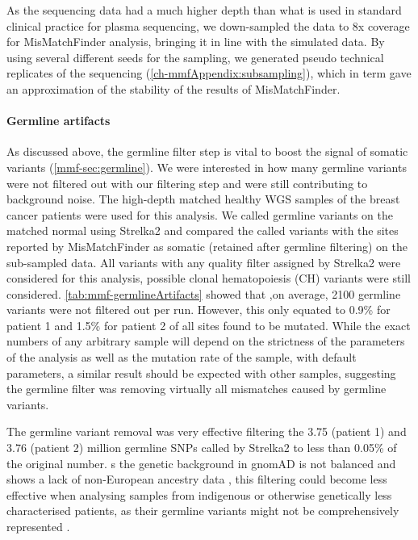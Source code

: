 As the sequencing data had a much higher depth than what is used in standard clinical practice for plasma sequencing, we down-sampled the data to 8x coverage for MisMatchFinder analysis, bringing it in line with the simulated data. By using several different seeds for the sampling, we generated pseudo technical replicates of the sequencing (\autoref{ch-mmfAppendix:subsampling}), which in term gave an approximation of the stability of the results of MisMatchFinder.


\paragraph{Germline artifacts}
\label{mmf-sec:germlineArtifacts}
As discussed above, the germline filter step is vital to boost the signal of somatic variants (\autoref{mmf-sec:germline}). We were interested in how many germline variants were not filtered out with our filtering step and were still contributing to background noise. The high-depth matched healthy WGS samples of the breast cancer patients were used for this analysis. We called germline variants on the matched normal using Strelka2 and compared the called variants with the sites reported by MisMatchFinder as somatic (retained after germline filtering) on the sub-sampled data. All variants with any quality filter assigned by Strelka2 were considered for this analysis,  possible clonal hematopoiesis (CH) variants were still considered. \autoref{tab:mmf-germlineArtifacts} showed that ,on average, 2100 germline variants were not filtered out per run. However, this only equated to 0.9\% for patient 1 and 1.5\% for patient 2 of all sites found to be mutated. While the exact numbers of any arbitrary sample will depend on the strictness of the parameters of the analysis as well as the mutation rate of the sample, with default parameters, a similar result should be expected with other samples, suggesting the germline filter was removing virtually all mismatches caused by germline variants.

The germline variant removal was  very effective filtering the 3.75 (patient 1) and 3.76 (patient 2) million germline SNPs called by Strelka2 to less than 0.05\% of the original number. s the genetic background in gnomAD is not balanced and shows a lack of non-European ancestry data \cite{Tiao2020}, this filtering could become less effective when analysing samples from indigenous or otherwise genetically less characterised patients, as their germline variants might not be comprehensively represented \cite{Nassar2022}.

